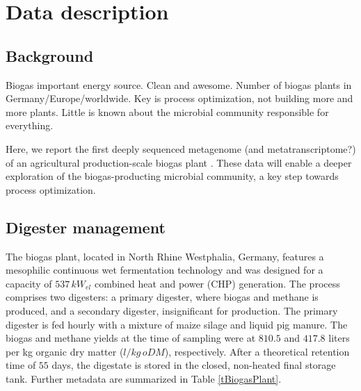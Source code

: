 \documentclass{bmcart}
\begin{document}


\section*{Data description}
%
\subsection*{Background}
Biogas important energy source. Clean and awesome.
Number of biogas plants in Germany/Europe/worldwide.
Key is process optimization, not building more and more plants.
Little is known about the microbial community responsible for everything.

Here, we report the first deeply sequenced metagenome (and metatranscriptome?) of an agricultural production-scale biogas plant \cite{GigaScience}. 
These data will enable a deeper exploration of the biogas-producting microbial community, a key step towards process optimization.
%
\subsection*{Digester management}
The biogas plant, located in North Rhine Westphalia, Germany, features a mesophilic continuous wet fermentation technology and was designed for a capacity of $537\,kW_{el}$ combined heat and power (CHP) generation.
The process comprises two digesters: a primary digester, where biogas and methane is produced, and a secondary digester, insignificant for production.
The primary digester is fed hourly with a mixture of maize silage and liquid pig manure.
The biogas and methane yields at the time of sampling were at $810.5$ and $417.8$ liters per kg organic dry matter ($l / kg\,oDM$), respectively.
After a theoretical retention time of $55$ days, the digestate is stored in the closed, non-heated final storage tank.
Further metadata are summarized in Table \ref{tBiogasPlant}.
%
\end{document}

